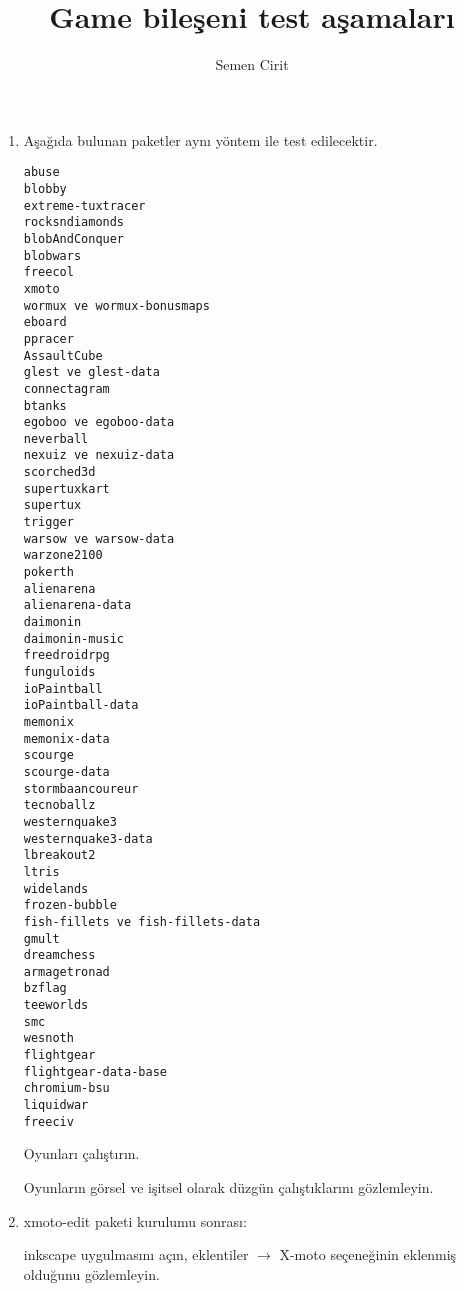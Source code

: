 \documentclass[a4paper,10pt]{article}
\title{Game bileşeni test aşamaları}
\author{Semen Cirit}
\begin{document}
\maketitle

\begin{enumerate}
\item Aşağıda bulunan paketler aynı yöntem ile test edilecektir.
\begin{verbatim}
abuse
blobby
extreme-tuxtracer
rocksndiamonds 
blobAndConquer
blobwars
freecol
xmoto
wormux ve wormux-bonusmaps
eboard
ppracer
AssaultCube
glest ve glest-data
connectagram
btanks
egoboo ve egoboo-data
neverball
nexuiz ve nexuiz-data
scorched3d
supertuxkart
supertux
trigger
warsow ve warsow-data
warzone2100
pokerth
alienarena
alienarena-data
daimonin
daimonin-music
freedroidrpg
funguloids
ioPaintball
ioPaintball-data
memonix
memonix-data
scourge
scourge-data
stormbaancoureur
tecnoballz
westernquake3
westernquake3-data
lbreakout2
ltris
widelands
frozen-bubble
fish-fillets ve fish-fillets-data
gmult
dreamchess
armagetronad
bzflag
teeworlds
smc
wesnoth
flightgear
flightgear-data-base
chromium-bsu
liquidwar
freeciv
\end{verbatim}

Oyunları çalıştırın.

Oyunların görsel ve işitsel olarak düzgün çalıştıklarını gözlemleyin.

\item xmoto-edit paketi kurulumu sonrası:

inkscape uygulmasını açın, eklentiler $\rightarrow$ X-moto seçeneğinin eklenmiş olduğunu gözlemleyin.
\end{enumerate}
\end{document}
